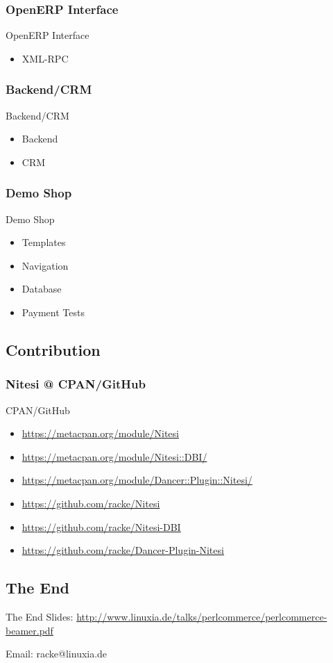 \subsubsection{OpenERP Interface}
\begin{frame}{OpenERP Interface} 
  \begin{itemize}
  \item XML-RPC
  \end{itemize}
\end{frame}

\subsubsection{Backend/CRM}
\begin{frame}{Backend/CRM} 
  \begin{itemize}
  \item Backend
  \item CRM
  \end{itemize}
\end{frame}

\subsubsection{Demo Shop}
\begin{frame}{Demo Shop} 
  \begin{itemize}
  \item Templates
  \item Navigation
  \item Database
  \item Payment Tests
  \end{itemize}
\end{frame}

\subsection{Contribution}
\subsubsection{Nitesi @ CPAN/GitHub}
\begin{frame}{CPAN/GitHub}
\begin{itemize}
\item \url{https://metacpan.org/module/Nitesi}
\item \url{https://metacpan.org/module/Nitesi::DBI/}
\item \url{https://metacpan.org/module/Dancer::Plugin::Nitesi/}
\end{itemize}
\begin{itemize}
\item \url{https://github.com/racke/Nitesi}
\item \url{https://github.com/racke/Nitesi-DBI}
\item \url{https://github.com/racke/Dancer-Plugin-Nitesi}
\end{itemize}
\end{frame}

\subsection{The End}
\begin{frame}{The End}
Slides:
\url{http://www.linuxia.de/talks/perlcommerce/perlcommerce-beamer.pdf}

Email:
racke@linuxia.de
\end{frame}


